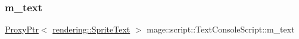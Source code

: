 \hypertarget{classmage_1_1script_1_1_text_console_script_ae36b6e921f3e44488baa62df3d283210}{}\label{classmage_1_1script_1_1_text_console_script_ae36b6e921f3e44488baa62df3d283210} 
\subsubsection{\texorpdfstring{m\+\_\+text}{m\_text}}
{\footnotesize\ttfamily \hyperlink{classmage_1_1_proxy_ptr}{Proxy\+Ptr}$<$ \hyperlink{classmage_1_1rendering_1_1_sprite_text}{rendering\+::\+Sprite\+Text} $>$ mage\+::script\+::\+Text\+Console\+Script\+::m\+\_\+text\hspace{0.3cm}{\ttfamily [private]}}

